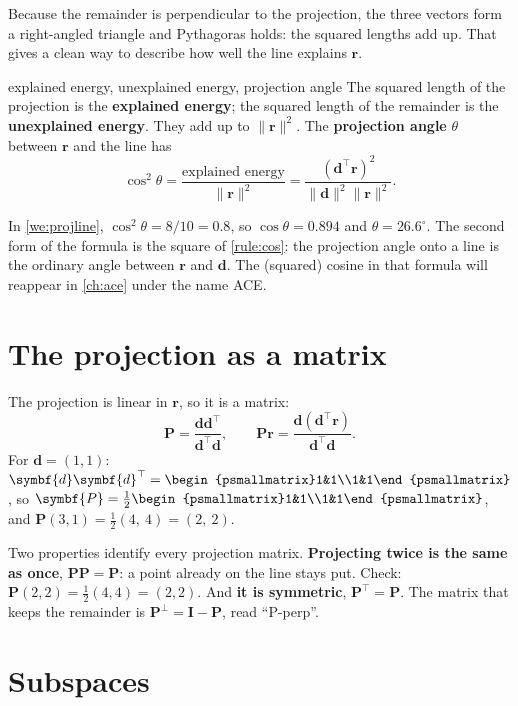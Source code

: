 \documentclass[11pt,a4paper,oneside,openany]{book}
\newcommand{\B}[1]{{\symbf{#1}}}
\newcommand{\B}[1]{{\bm{#1}}}
\newcommand{\T}{^{\top}}
\newcommand{\nrm}[1]{\lVert #1\rVert}
\newcommand{\vr}{\B{r}}
\newcommand{\vd}{\B{d}}
\newcommand{\mP}{\B{P}}
\newcommand{\mI}{\B{I}}
\begin{document}
Because the remainder is perpendicular to the projection, the three vectors form a right-angled triangle and Pythagoras holds:
the squared lengths add up. That gives a clean way to describe how well the line explains $\vr$.

\begin{defn}{explained energy, unexplained energy, projection angle}
The squared length of the projection is the \textbf{explained energy}; the squared length of the remainder is the
\textbf{unexplained energy}. They add up to $\nrm{\vr}^2$. The \textbf{projection angle} $\theta$ between $\vr$ and the line has
\[
  \cos^2\theta=\frac{\text{explained energy}}{\nrm{\vr}^2}=\frac{(\vd\T\vr)^2}{\nrm{\vd}^2\nrm{\vr}^2}.
\]
\end{defn}

In \cref{we:projline}, $\cos^2\theta=8/10=0.8$, so $\cos\theta=0.894$ and $\theta=26.6^\circ$. The second form of the formula is the
square of \cref{rule:cos}: the projection angle onto a line is the ordinary angle between $\vr$ and $\vd$. The (squared) cosine
in that formula will reappear in \cref{ch:ace} under the name ACE.

\section{The projection as a matrix}

The projection is linear in $\vr$, so it is a matrix:
\[
  \mP=\frac{\vd\vd\T}{\vd\T\vd},\qquad \mP\vr=\frac{\vd(\vd\T\vr)}{\vd\T\vd}.
\]
For $\vd=(1,1)$: $\vd\vd\T=\begin{psmallmatrix}1&1\\1&1\end{psmallmatrix}$, so $\mP=\frac12\begin{psmallmatrix}1&1\\1&1\end{psmallmatrix}$,
and $\mP(3,1)=\frac12(4,\ 4)=(2,\ 2)$.

Two properties identify every projection matrix. \textbf{Projecting twice is the same as once}, $\mP\mP=\mP$: a point already
on the line stays put. Check: $\mP(2,2)=\frac12(4,4)=(2,2)$. And \textbf{it is symmetric}, $\mP\T=\mP$. The matrix that keeps the
remainder is $\mP^\perp=\mI-\mP$, read ``P-perp''.

\section{Subspaces}
\end{document}
